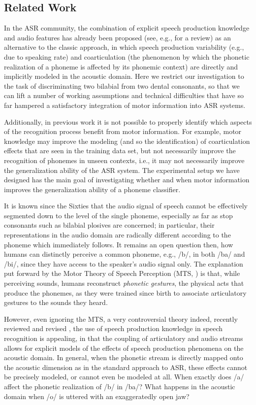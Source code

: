 \documentclass[10pt]{article}
\begin{document}
\subsection*{Related Work}

In the ASR community, the combination of explicit speech production knowledge and audio
features has already been proposed (see, e.g., \cite{king} for a review) as an alternative to the
classic approach, in which speech production variability (e.g., due to speaking rate) and
coarticulation (the phenomenon by which the phonetic realization of a phoneme is affected
by its phonemic context) are directly and implicitly modeled in the acoustic domain.
Here we restrict our investigation to the task of discriminating two bilabial from two
dental consonants, so that we can lift a number of working assumptions and technical
difficulties that have so far hampered a satisfactory integration of motor information
into ASR systems.

Additionally, in previous work it is not possible to properly identify which aspects of the
recognition process benefit from motor information. For example, motor knowledge may improve
the modeling (and so the identification) of coarticulation effects that are seen in the training
data set, but not necessarily improve the recognition of phonemes in unseen contexts, i.e., it
may not necessarily improve the generalization ability of the ASR system. The
experimental setup we have designed has the main goal of investigating whether and when motor information
improves the generalization ability of a phoneme classifier.

It is known since the Sixties \cite{liberman1} that the audio signal of speech
cannot be effectively segmented down to the level of the single phoneme,
especially as far as stop consonants such as bilabial plosives
are concerned; in particular, their representations in the audio domain are
radically different according to the phoneme which immediately follows.
It remains an open question then, how humans can distinctly perceive a common
phoneme, e.g., /b/, in both /ba/ and /bi/, since they have access to the speaker's
audio signal only. The explanation put forward by the Motor Theory of Speech Perception
(MTS, \cite{liberman2}) is that, while perceiving sounds, humans reconstruct
\emph{phonetic gestures}, the physical acts that produce the phonemes, as they were
trained since birth to associate articulatory gestures to the sounds they heard.

However, even ignoring the MTS, a very controversial theory indeed, recently reviewed and
revised \cite{galant,massaro}, the use of speech production knowledge in speech recognition
is appealing, in that the coupling of articulatory and audio streams allows for explicit models
of the effects of speech production phenomena on the acoustic domain.
In general, when the phonetic stream is directly mapped onto the acoustic dimension as in the standard
approach to ASR, these effects cannot be precisely modeled, or cannot even be modeled at all.
When exactly does /a/ affect the phonetic realization of /b/ in /ba/?
What happens in the acoustic domain when /o/ is uttered with an exaggeratedly open jaw?
\end{document}

